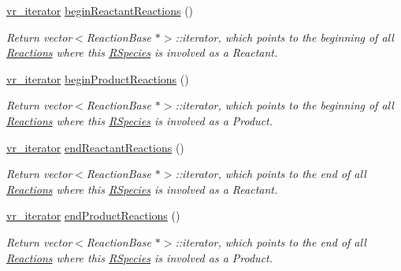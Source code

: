 \begin{DoxyCompactItemize}
\hyperlink{RSpecies_8h_a880cf21a44f76fb48cdb194a17487590}{vr\+\_\+iterator} \hyperlink{classRSpecies_abde1a54d7f5aeef2a95679b691c653ad}{begin\+Reactant\+Reactions} ()
\begin{DoxyCompactList}\small\item\em Return vector$<$\+Reaction\+Base $\ast$$>$\+::iterator, which points to the beginning of all \hyperlink{classReaction}{Reactions} where this \hyperlink{classRSpecies}{R\+Species} is involved as a Reactant. \end{DoxyCompactList}\item 
\hyperlink{RSpecies_8h_a880cf21a44f76fb48cdb194a17487590}{vr\+\_\+iterator} \hyperlink{classRSpecies_a9cb66f9a3c5488cb405c7287852b0219}{begin\+Product\+Reactions} ()
\begin{DoxyCompactList}\small\item\em Return vector$<$\+Reaction\+Base $\ast$$>$\+::iterator, which points to the beginning of all \hyperlink{classReaction}{Reactions} where this \hyperlink{classRSpecies}{R\+Species} is involved as a Product. \end{DoxyCompactList}\item 
\hyperlink{RSpecies_8h_a880cf21a44f76fb48cdb194a17487590}{vr\+\_\+iterator} \hyperlink{classRSpecies_ab4d59bf721abd8ea1f8611341d6e8483}{end\+Reactant\+Reactions} ()
\begin{DoxyCompactList}\small\item\em Return vector$<$\+Reaction\+Base $\ast$$>$\+::iterator, which points to the end of all \hyperlink{classReaction}{Reactions} where this \hyperlink{classRSpecies}{R\+Species} is involved as a Reactant. \end{DoxyCompactList}\item 
\hyperlink{RSpecies_8h_a880cf21a44f76fb48cdb194a17487590}{vr\+\_\+iterator} \hyperlink{classRSpecies_a5afb91e624b040c2f10d44f446668f7d}{end\+Product\+Reactions} ()
\begin{DoxyCompactList}\small\item\em Return vector$<$\+Reaction\+Base $\ast$$>$\+::iterator, which points to the end of all \hyperlink{classReaction}{Reactions} where this \hyperlink{classRSpecies}{R\+Species} is involved as a Product. \end{DoxyCompactList}\end{DoxyCompactItemize}
